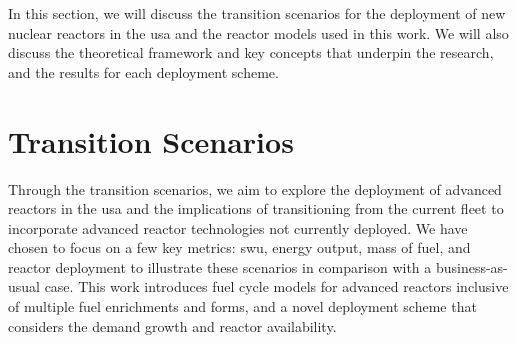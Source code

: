 In this section, we will discuss the transition scenarios for the deployment of new nuclear reactors in the \gls{usa} and the reactor models used in this work. We will also discuss the theoretical framework and key concepts that underpin the research, and the results for each deployment scheme.

\section{Transition Scenarios}
\label{sec:transition_scenarios}

Through the transition scenarios, we aim to explore the deployment of advanced reactors in the \gls{usa} and the implications of transitioning from the current fleet to incorporate advanced reactor technologies not currently deployed. We have chosen to focus on a few key metrics: \gls{swu}, energy output, mass of fuel, and reactor deployment to illustrate these scenarios in comparison with a business-as-usual case. This work introduces fuel cycle models for advanced reactors inclusive of multiple fuel enrichments and forms, and a novel deployment scheme that considers the demand growth and reactor availability.



